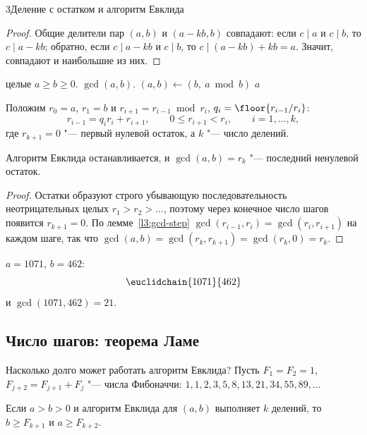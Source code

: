 \begin{lecture}{3}{Деление с остатком и алгоритм Евклида}
\begin{proof}
Общие делители пар $(a, b)$ и $(a - kb, b)$ совпадают: если $c \mid a$ и $c \mid b$, то
$c \mid a - kb$; обратно, если $c \mid a - kb$ и $c \mid b$, то $c \mid (a - kb) + kb = a$.
Значит, совпадают и наибольшие из них.
\end{proof}

\begin{algorithm}[Евклид]
\begin{algorithmic}[1]
\Require целые $a \ge b \ge 0$.
\Ensure $\gcd(a, b)$.
  \State $(a, b) \gets (b,\ a \bmod b)$
\EndWhile
\State \Return $a$
\end{algorithmic}
\end{algorithm}

Положим $r_0 = a$, $r_1 = b$ и $r_{i+1} = r_{i-1} \bmod r_i$, $q_i = \floor{r_{i-1}/r_i}$:
\[
  r_{i-1} = q_i r_i + r_{i+1}, \qquad 0 \le r_{i+1} < r_i, \qquad i = 1, \dots, k,
\]
где $r_{k+1} = 0$ "--- первый нулевой остаток, а $k$ "--- число делений.

\begin{theorem}\label{l3:euclid}
Алгоритм Евклида останавливается, и $\gcd(a, b) = r_k$ "--- последний ненулевой остаток.
\end{theorem}

\begin{proof}
Остатки образуют строго убывающую последовательность неотрицательных целых
$r_1 > r_2 > \dots$, поэтому через конечное число шагов появится $r_{k+1} = 0$. По
лемме~\ref{l3:gcd-step} $\gcd(r_{i-1}, r_i) = \gcd(r_i, r_{i+1})$ на каждом шаге, так что
$\gcd(a, b) = \gcd(r_k, r_{k+1}) = \gcd(r_k, 0) = r_k$.
\end{proof}

\begin{example}
$a = 1071$, $b = 462$:
\[
  \euclidchain{1071}{462}
\]
и $\gcd(1071, 462) = 21$.
\end{example}

\subsection{Число шагов: теорема Ламе}

Насколько долго может работать алгоритм Евклида? Пусть $F_1 = F_2 = 1$, $F_{j+2} = F_{j+1} + F_j$ "---
числа Фибоначчи: $1, 1, 2, 3, 5, 8, 13, 21, 34, 55, 89, \dots$

\begin{theorem}[Ламе, 1844]\label{l3:lame}
Если $a > b > 0$ и алгоритм Евклида для $(a, b)$ выполняет $k$ делений, то $b \ge F_{k+1}$
и $a \ge F_{k+2}$.
\end{theorem}


\end{lecture}
